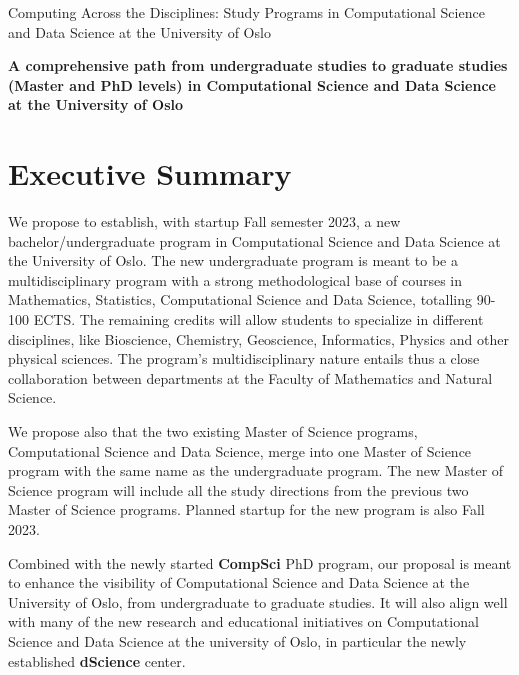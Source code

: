 \documentclass[oneside,final,10pt]{article}
\begin{document}
\thispagestyle{empty}

\begin{center}
{\LARGE\bf
\begin{spacing}{1.25}
Computing Across the Disciplines: Study Programs in Computational Science and Data Science at the University of Oslo
\end{spacing}
}
\end{center}

\begin{center}
{\bf A comprehensive path from undergraduate studies to graduate studies (Master and PhD levels) in Computational Science and Data Science at the University of Oslo }\\ [0mm]
\end{center}


\vspace{1cm}


\section*{Executive Summary}

We propose to establish, with startup Fall semester 2023, a new bachelor/undergraduate program in Computational Science and Data Science at the University of Oslo. 
The new undergraduate program is meant to be a multidisciplinary program with  a strong methodological base of courses in Mathematics, Statistics, Computational Science and Data Science, totalling 90-100 ECTS. The remaining credits will allow students to specialize in different disciplines, like Bioscience, Chemistry, Geoscience, Informatics, Physics and other physical sciences. The program's multidisciplinary nature entails thus a close collaboration between departments at the Faculty of Mathematics and Natural Science.  

We propose also that the two existing Master of Science programs, Computational Science and Data Science, merge into one Master of Science program with the same name as the undergraduate program. The new Master of Science program will include all the study directions from the previous two Master of Science programs. Planned startup for the new program is also Fall 2023. 

Combined with the newly started {\bf CompSci} PhD program, our proposal is meant to enhance the visibility of Computational Science and Data Science at the University of Oslo, from undergraduate to graduate studies. It will also align well with many of the new research and educational initiatives on Computational Science and Data Science at the university of Oslo, in particular the newly established {\bf dScience} center.
\end{document}
